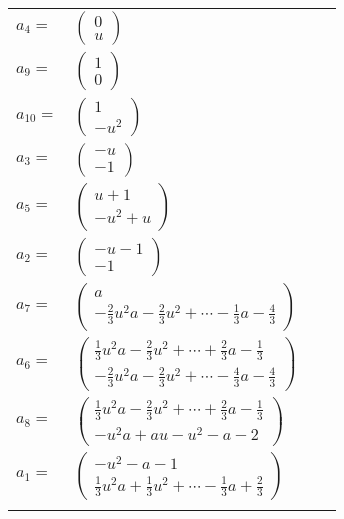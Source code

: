 \documentclass[1p]{elsarticle_modified}
\theoremstyle{definition}
\begin{document}
\begin{tabular}{m{7pt} m{180pt} m{7pt} m{180pt} }
\flushright $a_{4}=$&$\begin{pmatrix}0\\u\end{pmatrix}$ \\
\flushright $a_{9}=$&$\begin{pmatrix}1\\0\end{pmatrix}$ \\
\flushright $a_{10}=$&$\begin{pmatrix}1\\- u^2\end{pmatrix}$ \\
\flushright $a_{3}=$&$\begin{pmatrix}- u\\-1\end{pmatrix}$ \\
\flushright $a_{5}=$&$\begin{pmatrix}u+1\\- u^2+u\end{pmatrix}$ \\
\flushright $a_{2}=$&$\begin{pmatrix}- u-1\\-1\end{pmatrix}$ \\
\flushright $a_{7}=$&$\begin{pmatrix}a\\-\frac{2}{3} u^2 a-\frac{2}{3} u^2+\cdots-\frac{1}{3} a-\frac{4}{3}\end{pmatrix}$ \\
\flushright $a_{6}=$&$\begin{pmatrix}\frac{1}{3} u^2 a-\frac{2}{3} u^2+\cdots+\frac{2}{3} a-\frac{1}{3}\\-\frac{2}{3} u^2 a-\frac{2}{3} u^2+\cdots-\frac{4}{3} a-\frac{4}{3}\end{pmatrix}$ \\
\flushright $a_{8}=$&$\begin{pmatrix}\frac{1}{3} u^2 a-\frac{2}{3} u^2+\cdots+\frac{2}{3} a-\frac{1}{3}\\- u^2 a+a u- u^2- a-2\end{pmatrix}$ \\
\flushright $a_{1}=$&$\begin{pmatrix}- u^2- a-1\\\frac{1}{3} u^2 a+\frac{1}{3} u^2+\cdots-\frac{1}{3} a+\frac{2}{3}\end{pmatrix}$\\&\end{tabular}
\end{document}

